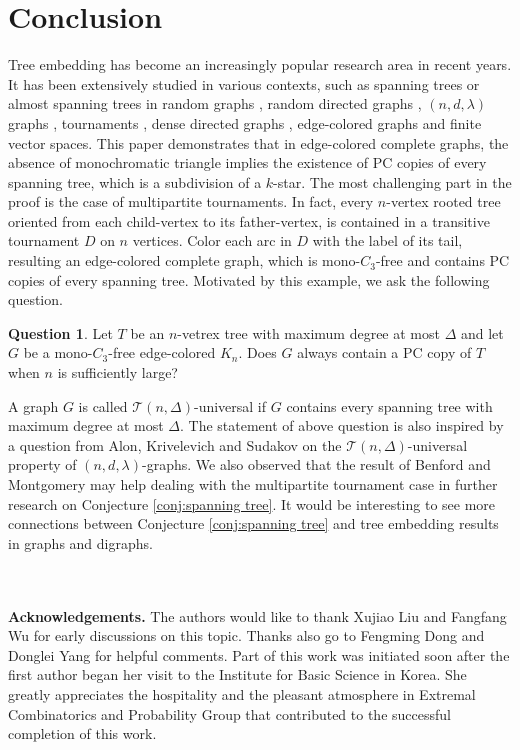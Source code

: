 \documentclass[10pt,a4paper]{article}
\theoremstyle{definition}
\newtheorem{question}{Question}
\begin{document}
\section{Conclusion}\label{sec:conclusion}
Tree embedding has become an increasingly popular research area in recent years. It has been extensively studied in various contexts, such as spanning trees or almost spanning trees in random graphs \cite{montgomery_spanning_2019}, random directed graphs \cite{montgomery_spanning_nodate}, $(n,d,\lambda)$ graphs \cite{han_spanning_2023,hyde_spanning_nodate}, tournaments \cite{benford_trees_2022,benford_trees_2022-1}, dense directed graphs \cite{kathapurkar_spanning_2022}, edge-colored graphs \cite{glock_decompositions_2021} and finite vector spaces\cite{chakraborti_almost_2024}.
This paper demonstrates that in edge-colored complete graphs, the absence of monochromatic triangle implies the existence of PC copies of every spanning tree, which is a subdivision of a $k$-star. The most challenging part in the proof is the case of multipartite tournaments. In fact, every $n$-vertex rooted tree oriented from each child-vertex to its father-vertex, is contained in a transitive tournament $D$ on $n$ vertices. Color each arc in $D$ with the label of its tail, resulting an edge-colored complete graph, which is mono-$C_3$-free and contains PC copies of every spanning tree. Motivated by this example, we ask the following question.
\begin{question}
Let $T$ be an $n$-vetrex tree with maximum degree at most $\Delta$ and let $G$ be a mono-$C_3$-free edge-colored $K_n$. Does $G$ always contain a PC copy of $T$ when $n$ is sufficiently large?
\end{question}
A graph $G$ is called $\mathcal{T}(n,\Delta)$-universal if $G$ contains every spanning tree with maximum degree at most $\Delta$. The statement of above question is also inspired by a question from Alon, Krivelevich and Sudakov\cite{alon_embedding_2007} on the $\mathcal{T}(n,\Delta)$-universal property of $(n,d,\lambda)$-graphs. We also observed that the result of Benford and Montgomery\cite{benford_trees_2022-1} may help dealing with the multipartite tournament case in further research on Conjecture \ref{conj:spanning tree}. It would be interesting to see more connections between Conjecture \ref{conj:spanning tree} and tree embedding results in graphs and digraphs.

~\\
~\\
{\bf Acknowledgements.} The authors would like to thank Xujiao Liu and Fangfang Wu for early discussions on this topic. Thanks also go to Fengming Dong and Donglei Yang for helpful comments. Part of this work was initiated soon after the first author began her visit to the Institute for Basic Science in Korea. She greatly appreciates the hospitality and the pleasant atmosphere in Extremal Combinatorics and Probability Group that contributed to the successful completion of this work.



\end{document}
